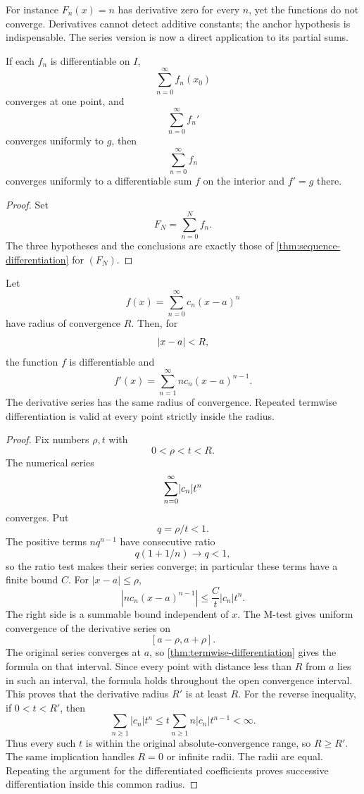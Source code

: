 For instance $F_n(x)=n$ has derivative zero for every $n$, yet the
functions do not converge. Derivatives cannot detect additive constants;
the anchor hypothesis is indispensable. The series version is now a
direct application to its partial sums.
\begin{corollary}
\label{thm:termwise-differentiation}
If each $f_n$ is differentiable on $I$,
\[
\sum_{n=0}^\infty f_n(x_0)
\]
converges at one point, and
\[
\sum_{n=0}^\infty f_n'
\]
converges uniformly to $g$, then
\[
\sum_{n=0}^\infty f_n
\]
 converges
uniformly to a differentiable sum $f$ on the
interior and $f'=g$ there.
\end{corollary}
\begin{proof}
Set
\[
F_N=\sum_{n=0}^Nf_n.
\]
 The three hypotheses and the conclusions
are exactly those of \cref{thm:sequence-differentiation} for $(F_N)$.
\end{proof}
\begin{theorem}
\label{thm:power-series-differentiation}
Let
\[
f(x)=\sum_{n=0}^{\infty}c_n(x-a)^n
\]
have radius of convergence $R$. Then, for
\[
\lvert x-a\rvert<R,
\]
the function $f$ is differentiable and
\[
f'(x)=\sum_{n=1}^{\infty}nc_n(x-a)^{n-1}.
\]
The derivative series has the same radius of convergence. Repeated termwise differentiation is valid at every point strictly inside the radius.
\end{theorem}
\begin{proof}
Fix numbers $\rho,t$ with
\[
0<\rho<t<R.
\]
The numerical series
\[
\sum_{n=0}^{\infty}\lvert c_n\rvert t^n
\]
converges. Put
\[
q=\rho/t<1.
\]
 The positive terms $nq^{n-1}$ have consecutive
ratio
\[
q(1+1/n)\to q<1,
\]
 so the ratio test makes their series converge;
in particular these terms have a finite bound $C$. For $|x-a|\leq\rho$,
\[
|nc_n(x-a)^{n-1}|
\leq \frac Ct |c_n|t^n.
\]
The right side is a summable bound independent of $x$. The M-test gives
uniform convergence of the derivative series on
\[
[a-\rho,a+\rho].
\]
The original series converges at $a$, so \cref{thm:termwise-differentiation} gives the formula on that interval. Since every point with distance less than $R$ from $a$ lies in such an interval, the formula holds throughout the open convergence interval. This proves that the derivative radius $R'$ is at least $R$.
For the reverse inequality, if $0<t<R'$, then
\[
\sum_{n\geq1}|c_n|t^n
\leq t\sum_{n\geq1}n|c_n|t^{n-1}<\infty.
\]
Thus every such $t$ is within the original absolute-convergence range,
so $R\geq R'$. The same implication handles $R=0$ or infinite radii.
The radii are equal. Repeating the argument for the differentiated
coefficients proves successive differentiation inside this common radius.
\end{proof}


